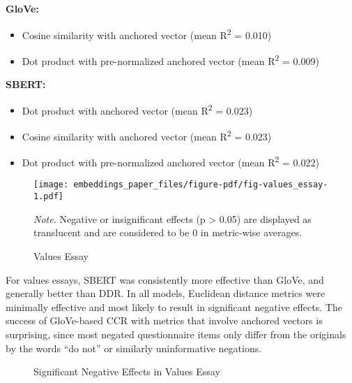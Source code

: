 \documentclass[
  man,
  floatsintext,
  longtable,
  nolmodern,
  notxfonts,
  notimes,
  colorlinks=true,linkcolor=blue,citecolor=blue,urlcolor=blue]{apa7}
\providecommand{\tightlist}{%
  \setlength{\itemsep}{0pt}\setlength{\parskip}{0pt}}
\begin{document}
\textbf{GloVe:}

\begin{itemize}
\tightlist
\item
  Cosine similarity with anchored vector (mean R\textsuperscript{2} =
  0.010)
\item
  Dot product with pre-normalized anchored vector (mean
  R\textsuperscript{2} = 0.009)
\end{itemize}

\textbf{SBERT:}

\begin{itemize}
\tightlist
\item
  Dot product with anchored vector (mean R\textsuperscript{2} = 0.023)
\item
  Cosine similarity with anchored vector (mean R\textsuperscript{2} =
  0.023)
\item
  Dot product with pre-normalized anchored vector (mean
  R\textsuperscript{2} = 0.022)
\end{itemize}

\begin{figure}

{\caption{{Values Essay}{\label{fig-values\_essay}}}}

\texttt{[image: embeddings\_paper\_files/figure-pdf/fig-values\_essay-1.pdf]}

{\noindent \emph{Note.} Negative or insignificant effects (p
\textgreater{} 0.05) are displayed as translucent and are considered to
be 0 in metric-wise averages.}

\end{figure}

For values essays, SBERT was consistently more effective than GloVe, and
generally better than DDR. In all models, Euclidean distance metrics
were minimally effective and most likely to result in significant
negative effects. The success of GloVe-based CCR with metrics that
involve anchored vectors is surprising, since most negated questionnaire
items only differ from the originals by the words ``do not'' or
similarly uninformative negations.

\begin{figure}

\caption{\label{fig-values_essay_neg}Significant Negative Effects in
Values Essay}


\end{figure}%
\end{document}
